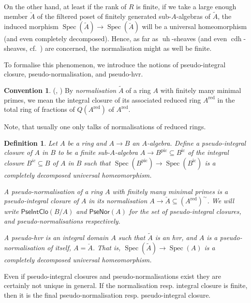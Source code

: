 \documentclass[10pt]{amsart}
\newtheorem{defi}[theo]{Definition}
\theoremstyle{definition}
\newtheorem*{conv}{Convention}
\newcommand{\p}{\mathfrak{p}}
\DeclareMathOperator{\Spec}{Spec}
\newcommand{\PN}{\mathsf{PseNor}}
\newcommand{\PIC}{\mathsf{PseIntClo}}
\newcommand{\cdh}{{{\operatorname{cdh}}}}
\newcommand{\uh}{\operatorname{uh}}
\newcommand{\red}{{\operatorname{red}}}
\newcommand{\ic}{{\operatorname{ic}}}
\newcommand{\pic}{{\operatorname{pic}}}
\begin{document}
On the other hand, at least if the rank of $R$ is finite, if we take a large enough member $\breve{A}$ of the filtered poset of finitely generated sub-$A$-algebras of $\widetilde{A}$, the induced morphism $\Spec(\widetilde{A}) \to \Spec(\breve{A})$ will be a universal homeomorphism (and even completely decomposed). Hence, as far as $\uh$-sheaves (and even $\cdh$-sheaves, cf.~\cite[Lem.2.9]{HK18}) are concerned, the normalisation might as well be finite.

To formalise this phenomenon, we introduce the notions of pseudo-integral closure, pseudo-normalisation, and pseudo-hvr.



\begin{conv}{({\cite[Cor.6.3.8]{EGAII}, \cite[Tag.035N,035P]{Stacks}})}
By \emph{normalisation} $\widetilde{A}$ of a ring $A$ with finitely many minimal primes, we mean the integral closure of its associated reduced ring $A^{\red}$ in the total ring of fractions of $Q(A^{\red})$ of $A^\red$.
\end{conv}

Note, that usually one only talks of normalisations of reduced rings.

\begin{defi} \label{defi:pn}
Let $A$ be a ring and $A \to B$ an $A$-algebra. Define a \emph{pseudo-integral closure} of $A$ in $B$ to be a \emph{finite} sub-$A$-algebra \mbox{$A {\to} B^{\pic} {\subseteq} B^{\ic}$} of the integral closure $B^{ic} \subseteq B$ of $A$ in $B$ such that $\Spec(B^\pic) \to \Spec(B^\ic)$ is a %
completely decomposed %
universal homeomorphism. 

A \emph{pseudo-normalisation} of a ring $A$ with finitely many minimal primes is a pseudo-integral closure of $A$ in its normalisation $A \to \breve{A} \subseteq (A^\red)^\sim$. We will write $\PIC(B/A)$ and $\PN(A)$ for the set of pseudo-integral closures, and pseudo-normalisations respectively.

A \emph{pseudo-hvr} is an integral domain $A$ such that $\widetilde{A}$ is an hvr, and $A$ is a pseudo-normalisation of itself, $A = \breve{A}$. That is, $\Spec(\widetilde{A}) \to \Spec(A)$ is a completely decomposed universal homeomorphism.
\end{defi}

Even if pseudo-integral closures and pseudo-normalisations exist they are certainly not unique in general. If the normalisation resp. integral closure is finite, then it is the final pseudo-normalisation resp. pseudo-integral closure.
\end{document}

